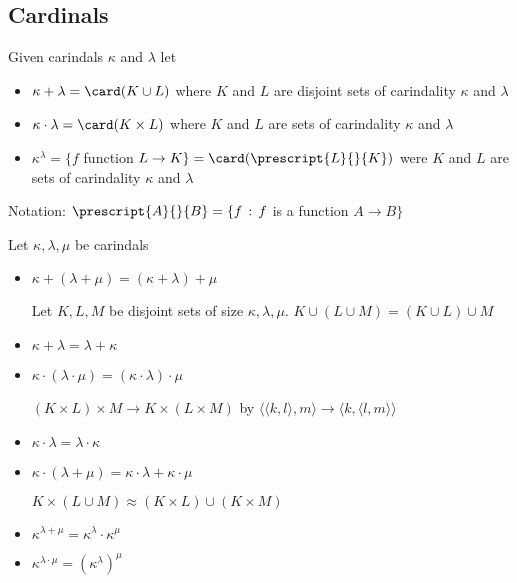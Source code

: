 
\subsection{Cardinals}

\begin{definition}
    Given carindals $\kappa$ and $\lambda$ let 
    \begin{itemize}
        \item $\kappa + \lambda = \card(K \cup L)$ where $K$ and $L$ are disjoint sets of carindality $\kappa$ and $\lambda$ 
        \item $\kappa \cdot \lambda = \card ( K \times L)$ where $K$ and $L$ are sets of carindality $\kappa$ and $\lambda$ 
        \item $\kappa^{\lambda} = \{ f$ function $L \to K\} = \card(\prescript{L}{}{K})$ were $K$ and $L$ are sets of carindality $\kappa$ and $\lambda$ 
    \end{itemize}
\end{definition}

\noindent
Notation: $\prescript{A}{}{B} = \{f \, : \, f$ is a function $A \to B\}$ 

\begin{theorem}
    Let $\kappa, \lambda, \mu$ be carindals 
    \begin{itemize}
        \item $\kappa + (\lambda + \mu) = (\kappa + \lambda) + \mu$ 
        \begin{pf}
            Let $K, L, M$ be disjoint sets of size $\kappa, \lambda, \mu$. $K \cup (L \cup M) = (K \cup L) \cup M$
        \end{pf}
        \item $\kappa + \lambda = \lambda + \kappa$
        \item $\kappa \cdot (\lambda \cdot \mu) = (\kappa \cdot \lambda) \cdot \mu$ 
        \begin{pf}
            $(K \times L ) \times M \to K \times (L \times M)$ by $\langle \langle k, l \rangle, m \rangle \to \langle k, \langle l, m \rangle \rangle$ 
        \end{pf}
        \item $\kappa \cdot \lambda = \lambda \cdot \kappa$ 
        \item $\kappa \cdot (\lambda + \mu) = \kappa \cdot \lambda + \kappa \cdot \mu$ 
        \begin{pf}
            $K \times (L \cup M) \approx (K \times L) \cup (K \times M)$ 
        \end{pf}
        \item $\kappa^{\lambda + \mu} = \kappa^{\lambda} \cdot \kappa^{\mu}$ 
        \item $\kappa^{\lambda \cdot \mu} = (\kappa^{\lambda})^{\mu}$ 
    \end{itemize}
\end{theorem}

